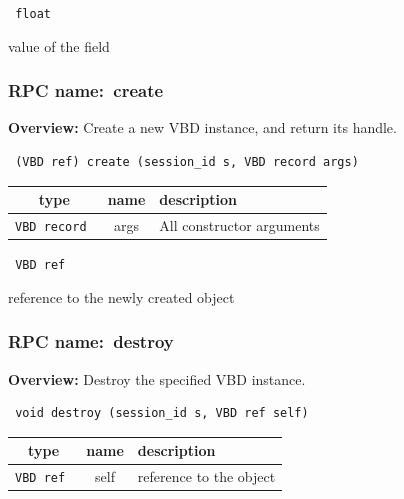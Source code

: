 \vspace{0.3cm}

{\tt 
float
}


value of the field
\vspace{0.3cm}
\vspace{0.3cm}
\vspace{0.3cm}
\subsubsection{RPC name:~create}

{\bf Overview:} 
Create a new VBD instance, and return its handle.

\begin{verbatim} (VBD ref) create (session_id s, VBD record args)\end{verbatim}



 
\vspace{0.3cm}
\begin{tabular}{|c|c|p{7cm}|}
 \hline
{\bf type} & {\bf name} & {\bf description} \\ \hline
{\tt VBD record } & args & All constructor arguments \\ \hline 

\end{tabular}

\vspace{0.3cm}

{\tt 
VBD ref
}


reference to the newly created object
\vspace{0.3cm}
\vspace{0.3cm}
\vspace{0.3cm}
\subsubsection{RPC name:~destroy}

{\bf Overview:} 
Destroy the specified VBD instance.

\begin{verbatim} void destroy (session_id s, VBD ref self)\end{verbatim}



 
\vspace{0.3cm}
\begin{tabular}{|c|c|p{7cm}|}
 \hline
{\bf type} & {\bf name} & {\bf description} \\ \hline
{\tt VBD ref } & self & reference to the object \\ \hline 

\end{tabular}

